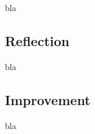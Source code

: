 \documentclass[a4paper]{article}
\begin{document}
bla

\subsection{Reflection}

bla

\subsection{Improvement}

bla




\end{document}
